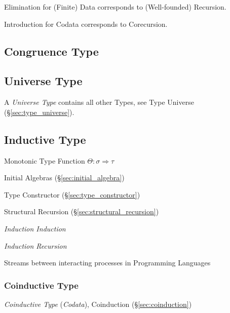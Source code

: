 Elimination for (Finite) Data corresponds to (Well-founded)
Recursion.

Introduction for Codata corresponds to Corecursion.



\subsection{Congruence Type}\label{sec:congruence_type}

\subsection{Universe Type}\label{sec:universe_type}

A \emph{Universe Type} contains all other Types, see Type Universe
(\S\ref{sec:type_universe}).



\subsection{Inductive Type}\label{sec:inductive_type}

Monotonic Type Function $\Theta : \sigma \Rightarrow \tau$

Initial Algebras (\S\ref{sec:initial_algebra})

Type Constructor (\S\ref{sec:type_constructor})

Structural Recursion (\S\ref{sec:structural_recursion})

\emph{Induction Induction}

\emph{Induction Recursion}

Streams between interacting processes in Programming Languages



\subsubsection{Coinductive Type}\label{sec:coinductive_type}

\emph{Coinductive Type} (\emph{Codata}), Coinduction
(\S\ref{sec:coinduction})




